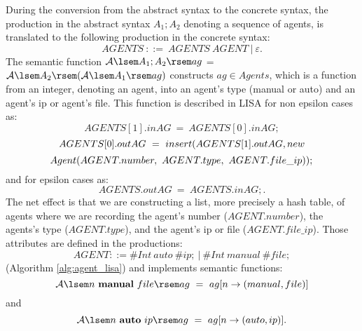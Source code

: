 \documentclass[preprint, prX]{revtex4}
\begin{document}
During the conversion from the abstract syntax to the concrete syntax, the production in the abstract syntax $A_1;A_2$ denoting a sequence of agents, is translated to the following production in the concrete syntax:
\footnotesize
\begin{equation*}
\mathit{AGENTS}\ ::=\ \mathit{AGENTS}\ \mathit{AGENT\ |\ \varepsilon}.
\end{equation*}
\normalsize
The semantic function $\mathcal{A} \lsem A_{1};A_{2}\rsem ag$ = $\mathcal{A} \lsem A_{2} \rsem (\mathcal{A} \lsem A_{1} \rsem ag)$
constructs $ag \in Agents$, which is a function from an integer, denoting an agent, into an agent's type (manual or auto) and an agent's ip or agent's file. This function is described in LISA for non epsilon cases as:
\footnotesize
\begin{equation*}
    AGENTS[1].inAG\ =\ AGENTS[0].inAG;
\end{equation*}
\begin{equation*}
    AGENTS[0].outAG\ =\ insert(AGENTS[1].outAG,new\\
\end{equation*}
\begin{equation*}
    Agent(AGENT.number,\ AGENT.type,\ AGENT.file\_ip));\\
\end{equation*}
\normalsize
and for epsilon cases as:
\footnotesize
\begin{equation*}
    AGENTS.outAG\ =\ AGENTS.inAG;.
\end{equation*}
\normalsize
The net effect is that we are constructing a list, more precisely a hash table, of agents where we are recording the agent's number ($AGENT.number$), the agents's type ($AGENT.type$), and the agent's ip or file ($AGENT.file\_ip$). Those attributes are defined
in the productions:
\footnotesize
\begin{equation*}
    AGENT ::= \#Int\ auto\ \#ip;\ |\ \#Int\ manual\ \#file;
\end{equation*}
\normalsize
(Algorithm \ref{alg:agent_lisa}) and implements semantic functions:
\footnotesize
\begin{equation*}
\mathcal{A} \lsem n\ \textbf{manual}\ file\rsem ag\ =\ ag [ n \rightarrow (manual, file) ]
\end{equation*}
\normalsize
and
\footnotesize
\begin{equation*}
\mathcal{A} \lsem n\ \textbf{auto}\ ip\rsem ag\ =\ ag [ n \rightarrow (auto, ip) ].
\end{equation*}
\normalsize
\end{document}
